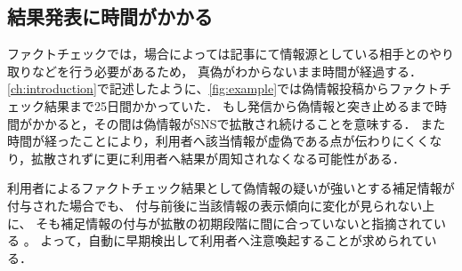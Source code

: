 \subsection{結果発表に時間がかかる}
ファクトチェックでは，場合によっては記事にて情報源としている相手とのやり取りなどを行う必要があるため，
真偽がわからないまま時間が経過する．
\cref{ch:introduction}で記述したように、\cref{fig:example}では偽情報投稿からファクトチェック結果まで25日間かかっていた．
もし発信から偽情報と突き止めるまで時間がかかると，その間は偽情報がSNSで拡散され続けることを意味する．
また時間が経ったことにより，利用者へ該当情報が虚偽である点が伝わりにくくなり，拡散されずに更に利用者へ結果が周知されなくなる可能性がある．

利用者によるファクトチェック結果として偽情報の疑いが強いとする補足情報が付与された場合でも、
付与前後に当該情報の表示傾向に変化が見られない上に、
そも補足情報の付与が拡散の初期段階に間に合っていないと指摘されている \cite{chuai2023rollout}。
よって，自動に早期検出して利用者へ注意喚起することが求められている．
